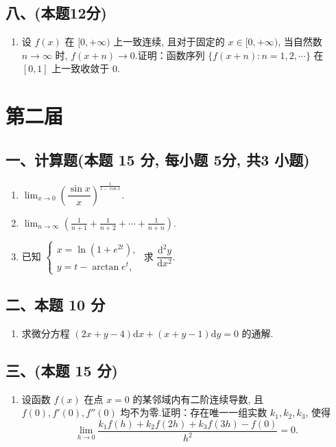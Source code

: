 \subsection*{八、(本题12分)}
\begin{enumerate}[start=12]
    \item 设 $f(x)$ 在 $[0,+\infty)$ 上一致连续, 且对于固定的 $x \in [0,+\infty)$, 当自然数 $n \rightarrow \infty$ 时, $f(x+n) \rightarrow 0$.证明：函数序列 $\{f(x+n): n = 1,2,\cdots\}$ 在 $[0,1]$ 上一致收敛于 0.
\end{enumerate}


\newpage
\section{第二届}

\subsection*{一、计算题(本题 15 分,  每小题 5分,  共3 小题)}
\begin{enumerate}
    \item $\displaystyle\lim_{x\rightarrow 0}\left(\dfrac{\sin x}{x}\right)^{\frac{1}{1-\cos x}}$.
    \item $\displaystyle\lim_{n\rightarrow\infty}\left(\frac{1}{n+1}+\frac{1}{n+2}+\cdots+\frac{1}{n+n}\right)$.
    \item 已知 $\begin{cases}
                  x = \ln(1+e^{2t}), \\
                  y = t - \arctan e^t,
              \end{cases}$ 求 $\dfrac{\mathrm{d}^2 y}{\mathrm{d} x^2}$.
\end{enumerate}

\subsection*{二、本题 10 分}
\begin{enumerate}[start=4]
    \item 求微分方程 $(2x+y-4)\mathrm{d}x+(x+y-1)\mathrm{d}y=0$ 的通解.
\end{enumerate}

\subsection*{三、(本题 15 分)}
\begin{enumerate}[start=5]
    \item 设函数 $f(x)$ 在点 $x=0$ 的某邻域内有二阶连续导数, 且 $f(0), f'(0), f''(0)$ 均不为零.证明：存在唯一一组实数 $k_1, k_2, k_3$, 使得
          \[
              \lim_{h\rightarrow 0}\frac{k_1f(h)+k_2f(2h)+k_3f(3h)-f(0)}{h^2}=0.
          \]
\end{enumerate}

